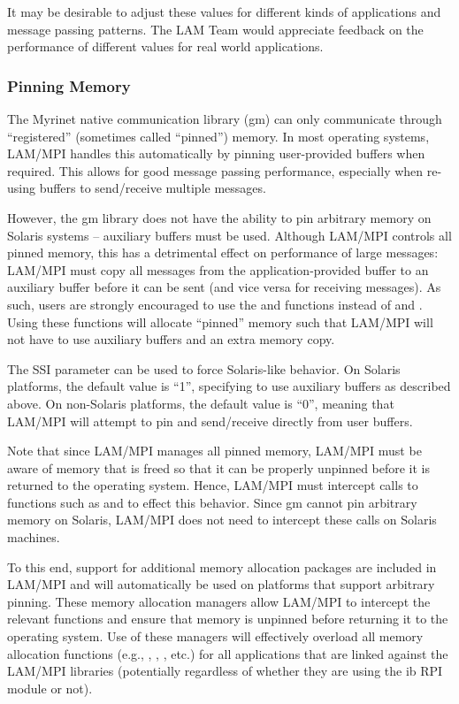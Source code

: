 It may be desirable to adjust these values for different kinds of
applications and message passing patterns.  The LAM Team would
appreciate feedback on the performance of different values for real
world applications.


\subsubsection{Pinning Memory}
\label{sec:mpi-ssi-gm-ptmalloc}

The Myrinet native communication library (gm) can only communicate
through ``registered'' (sometimes called ``pinned'') memory.  In most
operating systems, LAM/MPI handles this automatically by pinning
user-provided buffers when required.  This allows for good message
passing performance, especially when re-using buffers to send/receive
multiple messages.

However, the gm library does not have the ability to pin arbitrary
memory on Solaris systems -- auxiliary buffers must be used.  Although
LAM/MPI controls all pinned memory, this has a detrimental effect on
performance of large messages: LAM/MPI must copy all messages from the
application-provided buffer to an auxiliary buffer before it can be
sent (and vice versa for receiving messages).  As such, users are
strongly encouraged to use the  and
 functions instead of  and
.  Using these functions will allocate ``pinned'' memory
such that LAM/MPI will not have to use auxiliary buffers and an extra
memory copy.

The  SSI parameter can be used to force
Solaris-like behavior.  On Solaris platforms, the default value is
``1'', specifying to use auxiliary buffers as described above.  On
non-Solaris platforms, the default value is ``0'', meaning that
LAM/MPI will attempt to pin and send/receive directly from user
buffers.

Note that since LAM/MPI manages all pinned memory, LAM/MPI must be
aware of memory that is freed so that it can be properly unpinned
before it is returned to the operating system.  Hence, LAM/MPI must
intercept calls to functions such as  and 
to effect this behavior.  Since gm cannot pin arbitrary memory on
Solaris, LAM/MPI does not need to intercept these calls on Solaris
machines.

To this end, support for additional memory allocation packages are
included in LAM/MPI and will automatically be used on platforms that
support arbitrary pinning.  These memory allocation managers allow
LAM/MPI to intercept the relevant functions and ensure that memory is
unpinned before returning it to the operating system.  Use of these
managers will effectively overload all memory allocation functions
(e.g., , , , etc.) for all
applications that are linked against the LAM/MPI libraries
(potentially regardless of whether they are using the ib RPI module or
not).  

